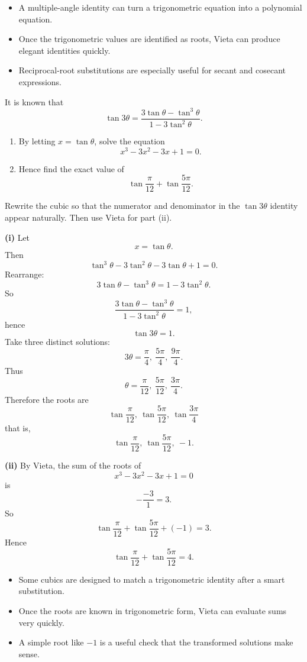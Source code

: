 \begin{takeaways}
\begin{itemize}[leftmargin=*]
\item A multiple-angle identity can turn a trigonometric equation into a polynomial equation.
\item Once the trigonometric values are identified as roots, Vieta can produce elegant identities quickly.
\item Reciprocal-root substitutions are especially useful for secant and cosecant expressions.
\end{itemize}
\end{takeaways}

\begin{problem}
It is known that
\[
\tan 3\theta=\frac{3\tan\theta-\tan^3\theta}{1-3\tan^2\theta}.
\]
\begin{enumerate}[label=(\roman*)]
\item By letting $x=\tan\theta$, solve the equation
\[
x^3-3x^2-3x+1=0.
\]
\item Hence find the exact value of
\[
\tan\frac{\pi}{12}+\tan\frac{5\pi}{12}.
\]
\end{enumerate}
\end{problem}

\begin{hintbox}
Rewrite the cubic so that the numerator and denominator in the $\tan 3\theta$ identity appear naturally. Then use Vieta for part (ii).
\end{hintbox}

\begin{solution}
\textbf{(i)} Let
\[
x=\tan\theta.
\]
Then
\[
\tan^3\theta-3\tan^2\theta-3\tan\theta+1=0.
\]
Rearrange:
\[
3\tan\theta-\tan^3\theta=1-3\tan^2\theta.
\]
So
\[
\frac{3\tan\theta-\tan^3\theta}{1-3\tan^2\theta}=1,
\]
hence
\[
\tan 3\theta=1.
\]
Take three distinct solutions:
\[
3\theta=\frac{\pi}{4},\ \frac{5\pi}{4},\ \frac{9\pi}{4}.
\]
Thus
\[
\theta=\frac{\pi}{12},\ \frac{5\pi}{12},\ \frac{3\pi}{4}.
\]
Therefore the roots are
\[
\boxed{\tan\frac{\pi}{12},\ \tan\frac{5\pi}{12},\ \tan\frac{3\pi}{4}}
\]
that is,
\[
\boxed{\tan\frac{\pi}{12},\ \tan\frac{5\pi}{12},\ -1.}
\]

\textbf{(ii)} By Vieta, the sum of the roots of
\[
x^3-3x^2-3x+1=0
\]
is
\[
-\frac{-3}{1}=3.
\]
So
\[
\tan\frac{\pi}{12}+\tan\frac{5\pi}{12}+(-1)=3.
\]
Hence
\[
\boxed{\tan\frac{\pi}{12}+\tan\frac{5\pi}{12}=4.}
\]
\end{solution}

\begin{takeaways}
\begin{itemize}[leftmargin=*]
\item Some cubics are designed to match a trigonometric identity after a smart substitution.
\item Once the roots are known in trigonometric form, Vieta can evaluate sums very quickly.
\item A simple root like $-1$ is a useful check that the transformed solutions make sense.
\end{itemize}
\end{takeaways}

